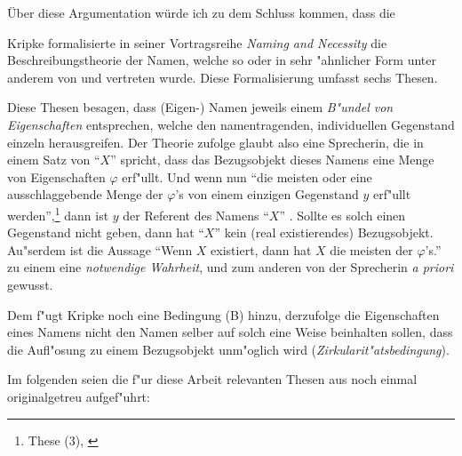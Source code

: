 \documentclass[a4paper, emulatestandardclasses, 12pt]{scrartcl}
\begin{document}
\begin{onehalfspace}
Über diese Argumentation würde ich zu dem Schluss kommen, dass die


\noindent Kripke formalisierte in seiner Vortragsreihe \emph{Naming and Necessity} \citep{kripke1972naming}  die Beschreibungstheorie der Namen, welche so oder in sehr "ahnlicher Form unter anderem von \citet{begriffundgegenstand} und \citet{russell1905denoting} vertreten wurde. Diese Formalisierung umfasst sechs Thesen.

Diese Thesen besagen, dass (Eigen-) Namen jeweils einem \emph{B"undel von Eigenschaften} entsprechen, welche den namentragenden, individuellen Gegenstand einzeln herausgreifen. Der Theorie zufolge glaubt also eine Sprecherin, die in einem Satz von "`$X$"' spricht, dass das Bezugsobjekt dieses Namens eine Menge von Eigenschaften $\varphi$ erf"ullt. Und wenn nun  "`die meisten oder eine ausschlaggebende Menge der $\varphi$'s von einem einzigen Gegenstand $y$ erf"ullt werden"',\footnote{These (3), \cite{kripke1972naming}} dann ist $y$ der Referent des Namens "`$X$"' . Sollte es solch einen Gegenstand nicht geben, dann hat "`$X$"' kein (real existierendes) Bezugsobjekt. Au"serdem ist die Aussage "`Wenn $X$ existiert, dann hat $X$ die meisten der $\varphi$'s."' zu einem eine \emph{notwendige Wahrheit}, und zum anderen von der Sprecherin \emph{a priori} gewusst.

Dem f"ugt Kripke noch eine Bedingung (B) hinzu, derzufolge die Eigenschaften eines Namens nicht den Namen selber auf solch eine Weise beinhalten sollen, dass die Aufl"osung zu einem Bezugsobjekt unm"oglich wird (\emph{Zirkularit"atsbedingung}).%

\noindent Im folgenden seien die f"ur diese Arbeit relevanten Thesen aus \citep{kripke1972naming} noch einmal originalgetreu aufgef"uhrt:\vspace{5mm}


\end{onehalfspace}
\end{document}
